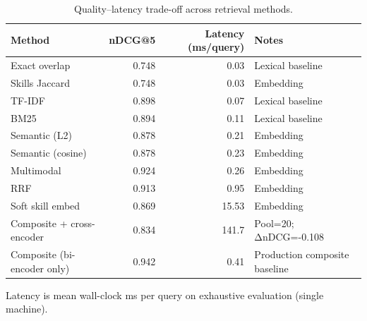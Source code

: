 \begin{table}[htbp]
\centering
\caption{Quality–latency trade-off across retrieval methods.}
\label{tab:latency}
\begin{tabular}{lrrl}
\toprule
Method & nDCG@5 & Latency (ms/query) & Notes \\
\midrule
Exact overlap & 0.748 & 0.03 & Lexical baseline \\
Skills Jaccard & 0.748 & 0.03 & Embedding \\
TF-IDF & 0.898 & 0.07 & Lexical baseline \\
BM25 & 0.894 & 0.11 & Lexical baseline \\
Semantic (L2) & 0.878 & 0.21 & Embedding \\
Semantic (cosine) & 0.878 & 0.23 & Embedding \\
Multimodal & 0.924 & 0.26 & Embedding \\
RRF & 0.913 & 0.95 & Embedding \\
Soft skill embed & 0.869 & 15.53 & Embedding \\
Composite + cross-encoder & 0.834 & 141.7 & Pool=20; ΔnDCG=-0.108 \\
Composite (bi-encoder only) & 0.942 & 0.41 & Production composite baseline \\
\bottomrule
\end{tabular}
\footnotesize{Latency is mean wall-clock ms per query on exhaustive evaluation (single machine).}
\end{table}
